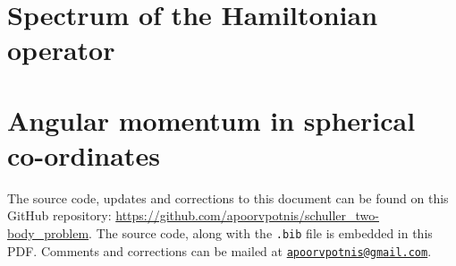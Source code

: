 \documentclass[12pt, a4 paper]{article}
\theoremstyle{definition}
\begin{document}
	\section{Spectrum of the Hamiltonian operator}

	\section{Angular momentum in spherical co-ordinates}\label{angmomentumsph}














%

	\nocite{*}
	\printbibliography[heading=bibintoc]

	\par\begin{spacing}{0.6}
		{\footnotesize The source code, updates and corrections to this document can be found on this GitHub repository: \url{https://github.com/apoorvpotnis/schuller_two-body_problem}. The source code, along with the \texttt{.bib} file is embedded in this PDF. Comments and corrections can be mailed at \href{mailto:apoorvpotnis@gmail.com}{\texttt{apoorvpotnis@gmail.com}}.}
	\end{spacing}
\end{document}
